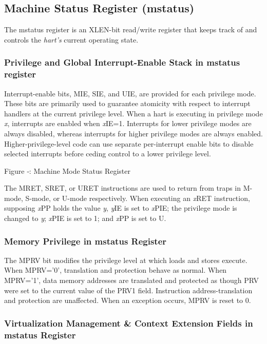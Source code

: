 \subsection{Machine Status Register
(mstatus)}\label{machine-status-register-mstatus}

The mstatus register is an XLEN-bit read/write register that keeps track
of and controls the \emph{hart's} current operating state.

\subsubsection{Privilege and Global Interrupt-Enable Stack in mstatus register}

Interrupt-enable bits, MIE, SIE, and UIE, are provided for each
privilege mode. These bits are primarily used to guarantee atomicity
with respect to interrupt handlers at the current privilege level. When
a hart is executing in privilege mode \emph{x}, interrupts are enabled
when \emph{x}IE=1. Interrupts for lower privilege modes are always
disabled, whereas interrupts for higher privilege modes are always
enabled. Higher-privilege-level code can use separate per-interrupt
enable bits to disable selected interrupts before ceding control to a
lower privilege level.

\missingfigure{}

Figure ‑: Machine Mode Status Register

The MRET, SRET, or URET instructions are used to return from traps in
M-mode, S-mode, or U-mode respectively. When executing an \emph{x}RET
instruction, supposing \emph{x}PP holds the value \emph{y}, \emph{y}IE
is set to \emph{x}PIE; the privilege mode is changed to \emph{y};
\emph{x}PIE is set to 1; and \emph{x}PP is set to U.

\subsubsection{Memory Privilege in mstatus Register
}\label{memory-privilege-in-mstatus-register}

The MPRV bit modifies the privilege level at which loads and stores
execute. When MPRV='0', translation and protection behave as normal.
When MPRV='1', data memory addresses are translated and protected as
though PRV were set to the current value of the PRV1 field. Instruction
address-translation and protection are unaffected. When an exception
occurs, MPRV is reset to 0.

\subsubsection{Virtualization Management \& Context Extension Fields in
mstatus Register
}\label{virtualization-management-context-extension-fields-in-mstatus-register}

